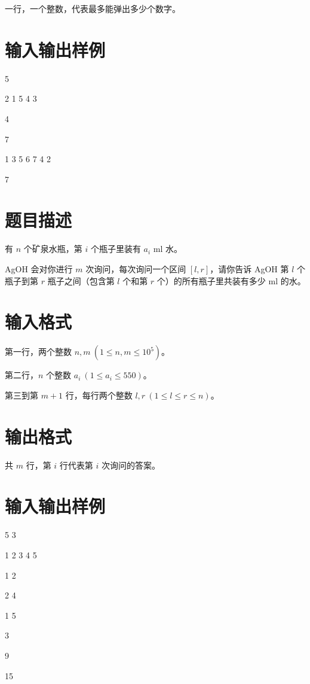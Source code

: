 \documentclass{../cpct/ctpro}
\begin{document}
一行，一个整数，代表最多能弹出多少个数字。

\section*{输入输出样例}

\testcasetab
{
    5\par
    2 1 5 4 3
}
{
    4
}

\testcasetab
{
    7\par
    1 3 5 6 7 4 2
}
{
    7
}

\makeproblem
\section*{题目描述}

有 $n$ 个矿泉水瓶，第 $i$ 个瓶子里装有 $a_i$ ml 水。

AgOH 会对你进行 $m$ 次询问，每次询问一个区间 $[l,r]$，请你告诉 AgOH 第 $l$ 个瓶子到第 $r$ 瓶子之间（包含第 $l$ 个和第 $r$ 个）的所有瓶子里共装有多少 ml 的水。

\section*{输入格式}

第一行，两个整数 $n,m~(1 \leq n,m \leq {10}^5)$。

第二行，$n$ 个整数 $a_i~(1 \leq a_i \leq 550)$。

第三到第 $m+1$ 行，每行两个整数 $l,r~(1 \leq l \leq r \leq n)$。

\section*{输出格式}

共 $m$ 行，第 $i$ 行代表第 $i$ 次询问的答案。

\section*{输入输出样例}

\testcasetab
{
    5 3\par
    1 2 3 4 5\par
    1 2\par
    2 4\par
    1 5
}
{
    3\par
    9\par
    15
}

\makeproblem
\newcommand{\mahjong}[1]{\raisebox{-.4\height}{\texttt{[image: images/mahjong/\#1.png]}}}
\end{document}

